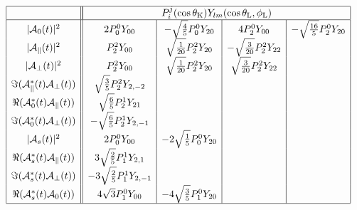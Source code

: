 \documentclass[a4paper,9pt,twosided]{article}
\def\thetaK{\theta_\mathrm{K}}
\def\thetaL{\theta_\mathrm{L}}
\def\phiL{\phi_\mathrm{L}}
\begin{document}
\begin{equation}
\begin{array}{|c|| c | c | c | c | }
 \hline
&\multicolumn{4}{|c|}{ P_i^j(\cos\thetaK)Y_{lm}(\cos\thetaL,\phiL) } \\
 \hline
|{\cal A}_0(t)|^2                       & 2P_0^0Y_{00} & -\sqrt{\frac{4}{5}}P_0^0Y_{20} & 4P_2^0Y_{00} & -\sqrt{\frac{16}{5}} P_2^0Y_{20}  \\
|{\cal A}_\parallel(t)|^2               & P_2^2Y_{00} &\sqrt{\frac{1}{20}} P_2^2Y_{20} &-\sqrt{\frac{3}{20}}P_2^2Y_{22} & \\
|{\cal A}_\perp(t)|^2                   & P_2^2Y_{00} & \sqrt{\frac{1}{20}} P_2^2Y_{20} &\sqrt{\frac{3}{20}}P_2^2Y_{22} & \\
\Im({\cal A}_\parallel^*(t){\cal A}_\perp(t)) & \sqrt{\frac{3}{5}}P_2^2Y_{2,-2}&&&\\
\Re({\cal A}_0^*(t){\cal A}_\parallel(t))     & \sqrt{\frac{6}{5}}P_2^1Y_{21}&&&\\
\Im({\cal A}_0^*(t){\cal A}_\perp(t))         & -\sqrt{\frac{6}{5}}P_2^1Y_{2,-1}&&&\\
|{\cal A}_{s}(t)|^2                   &  2 P_0^0 Y_{00} & -2 \sqrt{\frac{1}{5}} P_0^0 Y_{20} && \\
\Re({\cal A}_{s}^*(t){\cal A}_\parallel(t))   &  3\sqrt{\frac{2}{5}} P_1^1 Y_{2,1} &&& \\
\Im({\cal A}_{s}^*(t){\cal A}_\perp(t))     &  -3\sqrt{\frac{2}{5}} P_1^1 Y_{2,-1} &&& \\
\Re({\cal A}_{s}^*(t){\cal A}_0(t))   &  4 \sqrt{3} P_1^0 Y_{00} & -4 \sqrt{\frac{3}{5}} P_1^0 Y_{20} && \\
 \hline
\end{array}
\end{equation}


\pagebreak
\end{document}
